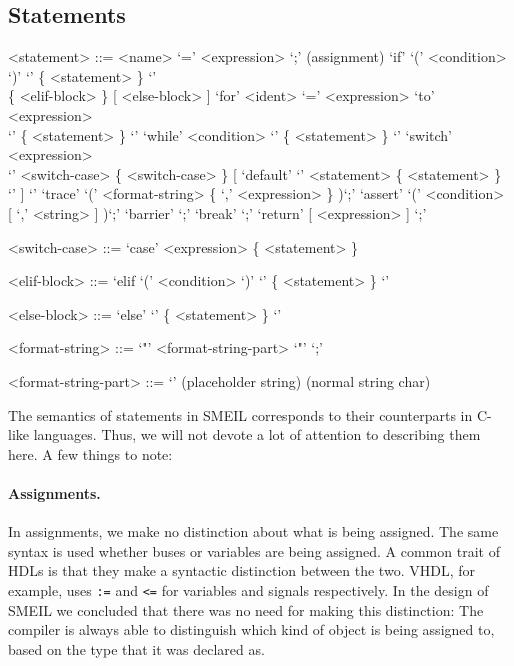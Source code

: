 

\subsection{Statements}
\begin{grammar}
  <statement> ::= <name> `=' <expression> `;' (assignment)
  \alt `if' `(' <condition> `)' `{' \{ <statement> \} `}' \\ \{ <elif-block>
    \} [ <else-block> ]
  \alt `for' <ident> `=' <expression> `to' <expression> \\ `{' \{ <statement> \} `}'
  \alt `while' <condition> `{' \{ <statement> \} `}'
  \alt `switch' <expression> \\ `{' <switch-case> \{ <switch-case> \}
  [ `default' `{' <statement> \{ <statement> \} `}' ] `}'
  \alt `trace' `(' <format-string> \{ `,' <expression> \} )`;'
  \alt `assert' `(' <condition> [ `,' <string> ] )`;'
  \alt `barrier' `;'
  \alt `break' `;'
  \alt `return' [ <expression> ] `;'

  <switch-case> ::= `case' <expression> \{ <statement> \}

  <elif-block> ::= `elif `(' <condition> `)' `{' \{ <statement> \} `}'

  <else-block> ::= `else' `{' \{ <statement> \} `}'

  <format-string> ::= `"' { <format-string-part> } `"' `;'
  
  <format-string-part> ::= `{}' (placeholder string)
   (normal string char)
\end{grammar}

The semantics of statements in SMEIL corresponds to their counterparts in C-like
languages. Thus, we will not devote a lot of attention to describing them
here. A few things to note:

\paragraph{Assignments.} In assignments, we make no distinction about what is
being assigned. The same syntax is used whether buses or variables are being
assigned. A common trait of HDLs is that they make a syntactic distinction
between the two. VHDL, for example, uses \texttt{:=} and \texttt{<=} for
variables and signals respectively. In the design of SMEIL we concluded that
there was no need for making this distinction: The compiler is always able to
distinguish which kind of object is being assigned to, based on the type that it
was declared as.

